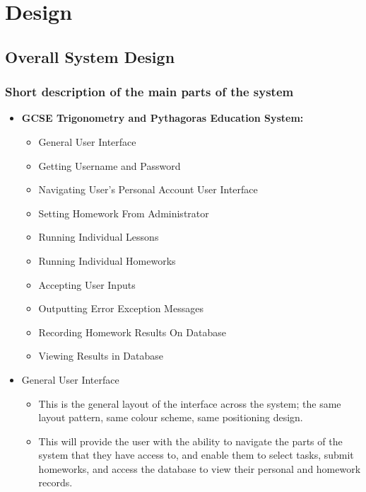 \chapter{Design}

\section{Overall System Design}

\subsection{Short description of the main parts of the system}

\begin{itemize}
	\item \textbf{GCSE Trigonometry and Pythagoras Education System:}
	\begin{itemize}
		\item General User Interface
		\item Getting Username and Password
		\item Navigating User's Personal Account User Interface
		\item Setting Homework From Administrator
		\item Running Individual Lessons
		\item Running Individual Homeworks
		\item Accepting User Inputs
		\item Outputting Error Exception Messages
		\item Recording Homework Results On Database
		\item Viewing Results in Database
	\end{itemize}
\end{itemize}

\begin{itemize}
	\item General User Interface
	\begin{itemize}
		\item This is the general layout of the interface across the system; the same layout pattern, same colour scheme, same positioning design.
		\item This will provide the user with the ability to navigate the parts of the system that they have access to, and enable them to select tasks, submit homeworks, and access the database to view their personal and homework records.
	\end{itemize}
\end{itemize}

